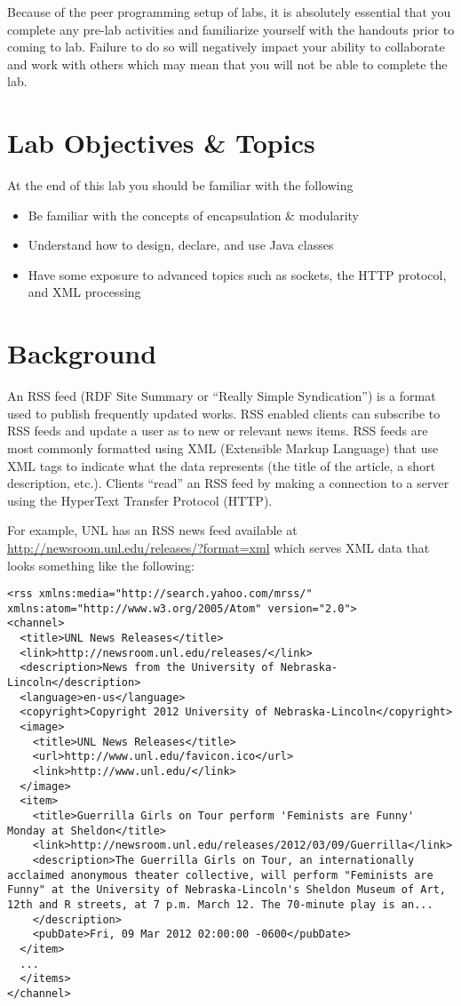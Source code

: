 \documentclass[12pt]{scrartcl}
\begin{document}
Because of the peer programming setup of labs, it is absolutely 
essential that you complete any pre-lab activities and familiarize
yourself with the handouts prior to coming to lab.  Failure to do
so will negatively impact your ability to collaborate and work with 
others which may mean that you will not be able to complete the
lab.  

\section{Lab Objectives \& Topics}
At the end of this lab you should be familiar with the following
\begin{itemize}
  \item Be familiar with the concepts of encapsulation \& modularity
  \item Understand how to design, declare, and use Java classes
  \item Have some exposure to advanced topics such as sockets, 
	the HTTP protocol, and XML processing
\end{itemize}

\section{Background}

An RSS feed (RDF Site Summary or ``Really Simple Syndication'') 
is a format used to publish frequently updated works.  RSS enabled 
clients can subscribe to RSS feeds and update a user as to new or 
relevant news items.  RSS feeds are most commonly formatted using 
XML (Extensible Markup Language) that use XML tags to indicate 
what the data represents (the title of the article, a short description, 
etc.).  Clients ``read'' an RSS feed by making a connection to a server 
using the HyperText Transfer Protocol (HTTP).

For example, UNL has an RSS news feed available at \url{http://newsroom.unl.edu/releases/?format=xml} 
which serves XML data that looks something like the following:

\begin{verbatim}
<rss xmlns:media="http://search.yahoo.com/mrss/" xmlns:atom="http://www.w3.org/2005/Atom" version="2.0">
<channel>
  <title>UNL News Releases</title>
  <link>http://newsroom.unl.edu/releases/</link>
  <description>News from the University of Nebraska-Lincoln</description>
  <language>en-us</language>
  <copyright>Copyright 2012 University of Nebraska-Lincoln</copyright>
  <image>
    <title>UNL News Releases</title>
    <url>http://www.unl.edu/favicon.ico</url>
    <link>http://www.unl.edu/</link>
  </image>
  <item>
    <title>Guerrilla Girls on Tour perform 'Feminists are Funny' Monday at Sheldon</title>
    <link>http://newsroom.unl.edu/releases/2012/03/09/Guerrilla</link>
    <description>The Guerrilla Girls on Tour, an internationally acclaimed anonymous theater collective, will perform "Feminists are Funny" at the University of Nebraska-Lincoln's Sheldon Museum of Art, 12th and R streets, at 7 p.m. March 12. The 70-minute play is an...
    </description>
    <pubDate>Fri, 09 Mar 2012 02:00:00 -0600</pubDate>
  </item>
  ...
  </items>
</channel>
\end{verbatim}
\end{document}
